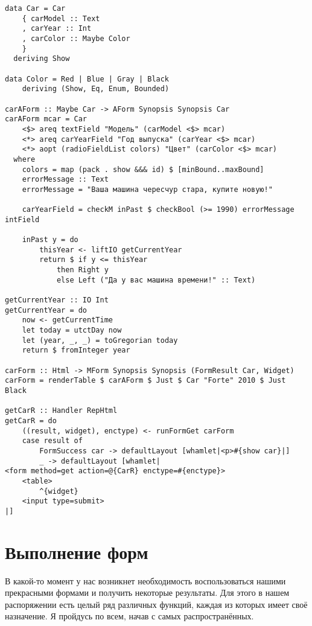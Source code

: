 \begin{lstlisting}[caption={Переключатели},label={lst:radio-buttons}]
data Car = Car
    { carModel :: Text
    , carYear :: Int
    , carColor :: Maybe Color
    }
  deriving Show

data Color = Red | Blue | Gray | Black
    deriving (Show, Eq, Enum, Bounded)

carAForm :: Maybe Car -> AForm Synopsis Synopsis Car
carAForm mcar = Car
    <$> areq textField "Модель" (carModel <$> mcar)
    <*> areq carYearField "Год выпуска" (carYear <$> mcar)
    <*> aopt (radioFieldList colors) "Цвет" (carColor <$> mcar)
  where
    colors = map (pack . show &&& id) $ [minBound..maxBound]
    errorMessage :: Text
    errorMessage = "Ваша машина чересчур стара, купите новую!"

    carYearField = checkM inPast $ checkBool (>= 1990) errorMessage intField

    inPast y = do
        thisYear <- liftIO getCurrentYear
        return $ if y <= thisYear
            then Right y
            else Left ("Да у вас машина времени!" :: Text)

getCurrentYear :: IO Int
getCurrentYear = do
    now <- getCurrentTime
    let today = utctDay now
    let (year, _, _) = toGregorian today
    return $ fromInteger year

carForm :: Html -> MForm Synopsis Synopsis (FormResult Car, Widget)
carForm = renderTable $ carAForm $ Just $ Car "Forte" 2010 $ Just Black

getCarR :: Handler RepHtml
getCarR = do
    ((result, widget), enctype) <- runFormGet carForm
    case result of
        FormSuccess car -> defaultLayout [whamlet|<p>#{show car}|]
        _ -> defaultLayout [whamlet|
<form method=get action=@{CarR} enctype=#{enctype}>
    <table>
        ^{widget}
    <input type=submit>
|]
\end{lstlisting}

\section{Выполнение форм}
В какой-то момент у нас возникнет необходимость воспользоваться нашими
прекрасными формами и получить некоторые результаты.  Для этого в нашем
распоряжении есть целый ряд различных функций, каждая из которых имеет своё
назначение. Я пройдусь по всем, начав с самых распространённых.

